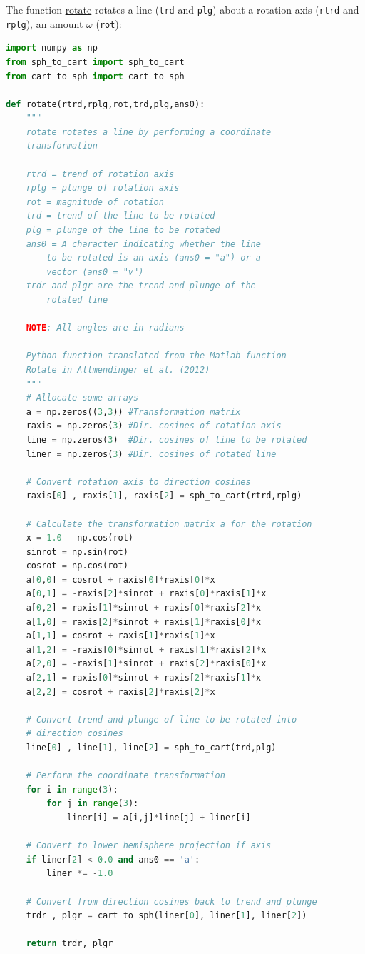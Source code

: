 \documentclass[a4paper , 12pt]{book}
\newcommand{\code}[1]{\colorbox{light-gray}{\texttt{#1}}}
\begin{document}
The function \href{https://github.com/nfcd/compGeo/blob/master/source/functions/rotate.py}{rotate} rotates a line (\code{trd} and \code{plg}) about a rotation axis (\code{rtrd} and \code{rplg}), an amount $\omega$ (\code{rot}):

\begin{center}
\begin{lstlisting}[language=Python, frame=single]
import numpy as np
from sph_to_cart import sph_to_cart
from cart_to_sph import cart_to_sph

def rotate(rtrd,rplg,rot,trd,plg,ans0):
	"""
	rotate rotates a line by performing a coordinate
	transformation
	
	rtrd = trend of rotation axis
	rplg = plunge of rotation axis
	rot = magnitude of rotation
	trd = trend of the line to be rotated
	plg = plunge of the line to be rotated
	ans0 = A character indicating whether the line 
		to be rotated is an axis (ans0 = "a") or a 
		vector (ans0 = "v")
	trdr and plgr are the trend and plunge of the
		rotated line
	
	NOTE: All angles are in radians
	
	Python function translated from the Matlab function
	Rotate in Allmendinger et al. (2012)
	"""
	# Allocate some arrays
	a = np.zeros((3,3)) #Transformation matrix
	raxis = np.zeros(3) #Dir. cosines of rotation axis
	line = np.zeros(3)	#Dir. cosines of line to be rotated
	liner = np.zeros(3) #Dir. cosines of rotated line
	
	# Convert rotation axis to direction cosines
	raxis[0] , raxis[1], raxis[2] = sph_to_cart(rtrd,rplg)
	
	# Calculate the transformation matrix a for the rotation
	x = 1.0 - np.cos(rot)
	sinrot = np.sin(rot)
	cosrot = np.cos(rot)
	a[0,0] = cosrot + raxis[0]*raxis[0]*x
	a[0,1] = -raxis[2]*sinrot + raxis[0]*raxis[1]*x
	a[0,2] = raxis[1]*sinrot + raxis[0]*raxis[2]*x
	a[1,0] = raxis[2]*sinrot + raxis[1]*raxis[0]*x
	a[1,1] = cosrot + raxis[1]*raxis[1]*x
	a[1,2] = -raxis[0]*sinrot + raxis[1]*raxis[2]*x
	a[2,0] = -raxis[1]*sinrot + raxis[2]*raxis[0]*x
	a[2,1] = raxis[0]*sinrot + raxis[2]*raxis[1]*x
	a[2,2] = cosrot + raxis[2]*raxis[2]*x
	
	# Convert trend and plunge of line to be rotated into
	# direction cosines
	line[0] , line[1], line[2] = sph_to_cart(trd,plg)
	
	# Perform the coordinate transformation
	for i in range(3):
		for j in range(3):
			liner[i] = a[i,j]*line[j] + liner[i]
	
	# Convert to lower hemisphere projection if axis 
	if liner[2] < 0.0 and ans0 == 'a':
		liner *= -1.0
		
	# Convert from direction cosines back to trend and plunge
	trdr , plgr = cart_to_sph(liner[0], liner[1], liner[2])
	
	return trdr, plgr
\end{lstlisting}
\end{center}
\end{document}
